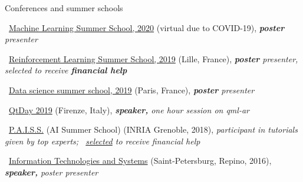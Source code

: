 \documentclass{resume} %
\newcommand{\mylink}{{\color{gray}\faExternalLink}}
\begin{document}
\begin{rSection}{Conferences and summer schools}
\vspace{-1em}
\item \mylink~\href{http://mlss.tuebingen.mpg.de/2020/}{Machine Learning Summer School, 2020} (virtual due to COVID-19){, \em {\bf poster} presenter}
\item \mylink~\href{https://rlss.inria.fr}{Reinforcement Learning Summer School, 2019} (Lille, France){, \em {\bf poster} presenter, selected to receive {\bf financial help}}
\item \mylink~\href{https://ds3-datascience-polytechnique.fr}{Data science summer school, 2019} (Paris, France){, \em {\bf poster} presenter}
\item \mylink~\href{https://www.qtday.it/agenda/session/52811}{QtDay 2019} (Firenze, Italy){, \em {\bf speaker,} one hour session on qml-ar}
\item \mylink~\href{https://project.inria.fr/paiss/}{P.A.I.S.S.} (AI Summer School) (INRIA Grenoble, 2018){, \em participant in tutorials given by top experts; \mylink~\href{http://www.europe.naverlabs.com/Blog/Students-at-PAISS}{selected} to receive financial help }
\item \mylink~\href{http://iitp.ru/en/conferences/itas}{Information Technologies and Systems} (Saint-Petersburg, Repino, 2016){, \em {\bf speaker,} poster presenter}
\end{rSection}

\end{document}
